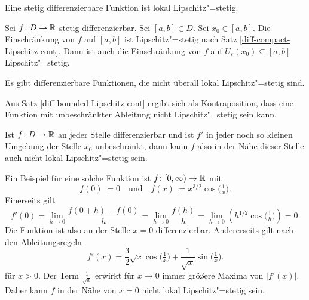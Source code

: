 \begin{Satz}
Eine stetig differenzierbare Funktion ist lokal Lipschitz"=stetig.
\end{Satz}
\begin{Beweis}
Sei $f\colon D\to\mathbb R$ stetig differenzierbar. Sei $[a,b]\in D$. Sei
$x_0\in [a,b]$. Die Einschränkung von $f$ auf $[a,b]$ ist
Lipschitz"=stetig nach Satz \ref{diff-compact-Lipschitz-cont}.
Dann ist auch die Einschränkung von $f$ auf
$U_\varepsilon(x_0)\subseteq [a,b]$ Lipschitz"=stetig.\;\qedsymbol
\end{Beweis}

\begin{Satz}
Es gibt differenzierbare Funktionen, die nicht überall lokal
Lipschitz"=stetig sind.
\end{Satz}
\begin{Beweis}
Aus Satz \ref{diff-bounded-Lipschitz-cont} ergibt sich als
Kontraposition, dass eine Funktion mit unbeschränkter Ableitung
nicht Lipschitz"=stetig sein kann.

Ist $f\colon D\to\mathbb R$ an jeder Stelle differenzierbar und ist $f'$
in jeder noch so kleinen Umgebung der Stelle $x_0$ unbeschränkt, dann
kann $f$ also in der Nähe dieser Stelle auch nicht lokal
Lipschitz"=stetig sein.

Ein Beispiel für eine solche Funktion ist $f\colon{}[0,\infty)\to\mathbb R$
mit
\[f(0):=0\quad \text{und}\quad f(x):=x^{3/2}\cos\Big(\tfrac{1}{x}\Big).\]
Einerseits gilt
\[f'(0) = \lim_{h\to 0}\frac{f(0+h)-f(0)}{h} = \lim_{h\to 0}\frac{f(h)}{h}
= \lim_{h\to 0} (h^{1/2}\cos\Big(\tfrac{1}{h}\Big)) = 0.\]
Die Funktion ist also an der Stelle $x=0$ differenzierbar.
Andererseits gilt nach den Ableitungsregeln%
\[f'(x) = \frac{3}{2}\sqrt{x}\cos\Big(\tfrac{1}{x}\Big)+\frac{1}{\sqrt{x}}\sin\Big(\tfrac{1}{x}\Big).\]
für $x>0$. Der Term $\tfrac{1}{\sqrt{x}}$ erwirkt für $x\to 0$ immer
größere Maxima von $|f'(x)|$. Daher kann $f$ in der Nähe von $x=0$ nicht
lokal Lipschitz"=stetig sein.\;\qedsymbol
\end{Beweis}

